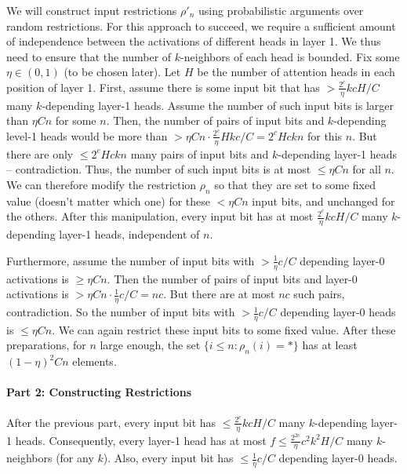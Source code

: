 \documentclass[11pt,a4paper]{article}
\begin{document}
We will construct input restrictions $\rho'_n$ using probabilistic arguments over random restrictions.
For this approach to succeed, we require a  sufficient amount of independence between the activations of different heads in layer 1.
We thus need to ensure that the number of $k$-neighbors of each head is bounded.
Fix some $\eta \in (0,1)$ (to be chosen later).
Let $H$ be the number of attention heads in each position of layer 1.
First, assume there is some input bit that has $>\frac{2^c}{\eta}kcH/C$ many $k$-depending layer-1 heads.
Assume the number of such input bits is larger than $\eta Cn$ for some $n$.
Then, the number of pairs of input bits and $k$-depending level-1 heads would be more than $> \eta C n \cdot \frac{2^c}{\eta} H k c/C = 2^c Hckn$ for this $n$.
But there are only $\leq 2^c Hckn$ many pairs of input bits and $k$-depending layer-1 heads -- contradiction.
Thus, the number of such input bits is at most $\leq \eta Cn$ for all $n$.
We can therefore modify the restriction $\rho_n$ so that they are set to some fixed value (doesn't matter which one) for these $<\eta Cn$ input bits, and unchanged for the others.
After this manipulation, every input bit has at most $\frac{2^c}{\eta}kcH/C$ many $k$-depending layer-1 heads, independent of $n$.

Furthermore, assume the number of input bits with $> \frac{1}{\eta} c/C$ depending layer-0 activations is $\geq \eta Cn$.
Then the number of pairs of input bits and layer-0 activations is $>\eta Cn \cdot \frac{1}{\eta} c/C = nc$.
But there are at most $nc$ such pairs, contradiction.
So the number of input bits with $> \frac{1}{\eta} c/C$ depending layer-0 heads is $\leq \eta Cn$.
We can again restrict these input bits to some fixed value. %
After these preparations, for $n$ large enough, the set $\{i \leq n: \rho_n(i) = *\}$ has at least $(1-\eta)^2 C n$ elements.

\paragraph{Part 2: Constructing Restrictions}
After the previous part, every input bit has $\leq \frac{2^c}{\eta}kcH/C$ many $k$-depending layer-1 heads.
Consequently, every layer-1 head has at most $f \leq \frac{2^{2c}}{\eta}c^2k^2H/C$ many $k$-neighbors (for any $k$).
Also, every input bit has $\leq \frac{1}{\eta}c/C$ depending layer-0 heads.
\end{document}
